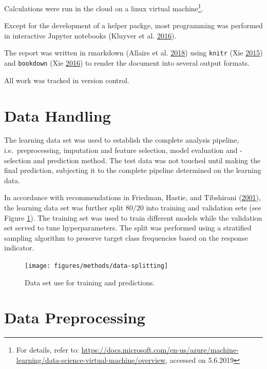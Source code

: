 \documentclass[
  11pt,
  a4paper,
  DIV=12,captions=tableheading,oneside,titlepage]{scrbook}
\begin{document}
Calculations were run in the cloud on a linux virtual machine\footnote{For details, refer to: \url{https://docs.microsoft.com/en-us/azure/machine-learning/data-science-virtual-machine/overview}, accessed on 5.6.2019}.

Except for the development of a helper packge, most programming was performed in interactive Jupyter notebooks (Kluyver et al. \protect\hyperlink{ref-Kluyver:2016aa}{2016}).

The report was written in rmarkdown (Allaire et al. \protect\hyperlink{ref-allaire2016rmarkdown}{2018}) using \texttt{knitr} (Xie \protect\hyperlink{ref-xie2015}{2015}) and \texttt{bookdown} (Xie \protect\hyperlink{ref-xie2016bookdown}{2016}) to render the document into several output formats.

All work was tracked in version control.

\hypertarget{data-handling}{%
\section{Data Handling}\label{data-handling}}

The learning data set was used to establish the complete analysis pipeline, i.e.~preprocessing, imputation and feature selection, model evaluation and -selection and prediction method. The test data was not touched until making the final prediction, subjecting it to the complete pipeline determined on the learning data.

In accordance with recommendations in Friedman, Hastie, and Tibshirani (\protect\hyperlink{ref-friedman2001elements}{2001}), the learning data set was further split 80/20 into training and validation sets (see Figure \ref{fig:data-splitting}). The training set was used to train different models while the validation set served to tune hyperparameters. The split was performed using a stratified sampling algorithm to preserve target class frequencies based on the response indicator.

\begin{figure}

{\centering \texttt{[image: figures/methods/data-splitting]} 

}

\caption{Data set use for training and predictions.}\label{fig:data-splitting}
\end{figure}

\hypertarget{data-preprocessing}{%
\section{Data Preprocessing}\label{data-preprocessing}}
\end{document}

